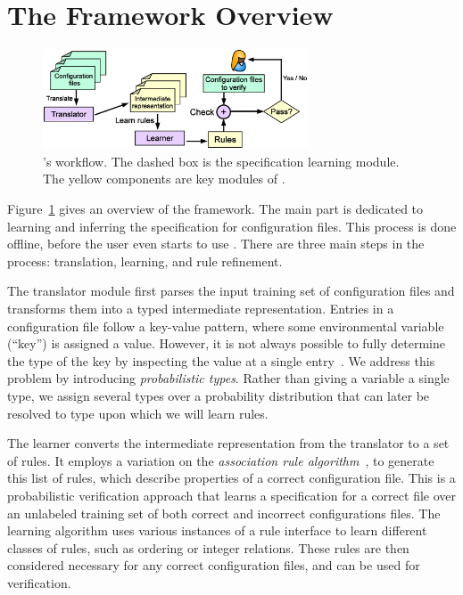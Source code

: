 
\section{The \app Framework Overview}

\begin{figure}[tbp] \centering
\includegraphics[width=0.7\textwidth]{figs/overview}
\caption{\app's workflow.
  The dashed box is the specification learning module. 
  The yellow components are key modules of \app.}
\label{fig-overview}
\end{figure}

Figure~\ref{fig-overview} gives an overview of the \app framework.
The main part is dedicated to 
learning and inferring the specification for configuration 
files. This process is done offline, before the user even starts 
to use \app. There are three main steps in the process:
translation, learning, and rule refinement.

The translator module first parses the input training  
set of configuration files and transforms them into 
a typed intermediate representation.
Entries in a configuration file follow a key-value pattern, 
where some environmental variable (``key'') is assigned a value.
However, it is not always possible to fully determine the type of the key
by inspecting the value at a single entry~\cite{xu15hey}.
We address this problem 
by introducing {\em probabilistic types}.
Rather than giving a variable a single type, 
we assign several types over a probability distribution that can later be resolved to type upon which we will learn rules.

The learner converts the intermediate representation from the translator to a set of rules.
It employs a variation on the {\em association rule 
algorithm}~\cite{agrawal1993mining}, to generate this list of rules, which describe properties of a correct configuration file. 
This is a probabilistic verification approach that learns a specification for a correct file over an unlabeled training set of both correct and incorrect configurations files.
The learning algorithm uses various instances of a rule interface to learn different classes of rules, such as ordering or integer relations.
These rules are then considered necessary for any correct configuration files, and can be used for verification.

